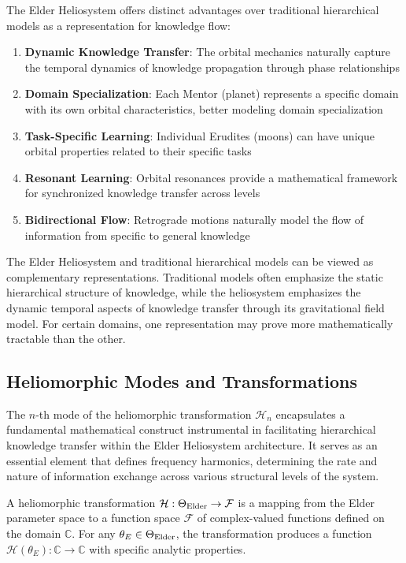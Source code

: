The Elder Heliosystem offers distinct advantages over traditional hierarchical models as a representation for knowledge flow:

\begin{enumerate}
    \item \textbf{Dynamic Knowledge Transfer}: The orbital mechanics naturally capture the temporal dynamics of knowledge propagation through phase relationships
    \item \textbf{Domain Specialization}: Each Mentor (planet) represents a specific domain with its own orbital characteristics, better modeling domain specialization
    \item \textbf{Task-Specific Learning}: Individual Erudites (moons) can have unique orbital properties related to their specific tasks
    \item \textbf{Resonant Learning}: Orbital resonances provide a mathematical framework for synchronized knowledge transfer across levels
    \item \textbf{Bidirectional Flow}: Retrograde motions naturally model the flow of information from specific to general knowledge
\end{enumerate}

\begin{remark}
The Elder Heliosystem and traditional hierarchical models can be viewed as complementary representations. Traditional models often emphasize the static hierarchical structure of knowledge, while the heliosystem emphasizes the dynamic temporal aspects of knowledge transfer through its gravitational field model. For certain domains, one representation may prove more mathematically tractable than the other.
\end{remark}

\subsection{Heliomorphic Modes and Transformations}

The $n$-th mode of the heliomorphic transformation \(\mathcal{H}_n\) encapsulates a fundamental mathematical construct instrumental in facilitating hierarchical knowledge transfer within the Elder Heliosystem architecture. It serves as an essential element that defines frequency harmonics, determining the rate and nature of information exchange across various structural levels of the system.

\begin{definition}
A heliomorphic transformation $\mathcal{H}: \Theta_{\text{Elder}} \rightarrow \mathcal{F}$ is a mapping from the Elder parameter space to a function space $\mathcal{F}$ of complex-valued functions defined on the domain $\mathbb{C}$. For any $\theta_E \in \Theta_{\text{Elder}}$, the transformation produces a function $\mathcal{H}(\theta_E): \mathbb{C} \rightarrow \mathbb{C}$ with specific analytic properties.
\end{definition}

